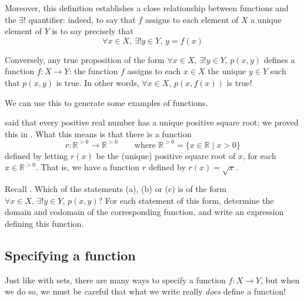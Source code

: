 Moreover, this definition establishes a close relationship between functions and the $\exists !$ quantifier: indeed, to say that $f$ assigns to each element of $X$ a unique element of $Y$ is to say precisely that
\[ \forall x \in X,\, \exists ! y \in Y,\, y = f(x) \]

Conversely, any true proposition of the form $\forall x \in X,\, \exists ! y \in Y,\, p(x,y)$ defines a function $f : X \to Y$: the function $f$ assigns to each $x \in X$ the unique $y \in Y$ such that $p(x,y)$ is true. In other words, $\forall x \in X,\, p(x,f(x))$ is true!

We can use this to generate some examples of functions.

\begin{example}
\label{exPositiveSquareRootFunction}
 said that every positive real number has a unique positive square root; we proved this in . What this means is that there is a function
\[ r : \mathbb{R}^{>0} \to \mathbb{R}^{>0} \qquad \text{where } \mathbb{R}^{>0} = \{ x \in \mathbb{R} \mid x > 0 \} \]
defined by letting $r(x)$ be the (unique) positive square root of $x$, for each $x \in \mathbb{R}^{>0}$. That is, we have a function $r$ defined by $r(x)=\sqrt{x}$.
\end{example}

\begin{exercise}
Recall . Which of the statements (a), (b) or (c) is of the form $\forall x \in X,\, \exists ! y \in Y,\, p(x,y)$? For each statement of this form, determine the domain and codomain of the corresponding function, and write an expression defining this function.
\end{exercise}

\subsection*{Specifying a function}

Just like with sets, there are many ways to specify a function $f : X \to Y$, but when we do so, we must be careful that what we write really \textit{does} define a function!

